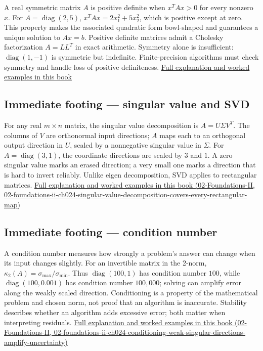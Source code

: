 A real symmetric matrix \(A\) is positive definite when \(x^TAx>0\) for every nonzero \(x\). For \(A=\operatorname{diag}(2,5)\), \(x^TAx=2x_1^2+5x_2^2\), which is positive except at zero. This property makes the associated quadratic form bowl-shaped and guarantees a unique solution to \(Ax=b\). Positive definite matrices admit a Cholesky factorization \(A=LL^T\) in exact arithmetic. Symmetry alone is insufficient: \(\operatorname{diag}(1,-1)\) is symmetric but indefinite. Finite-precision algorithms must check symmetry and handle loss of positive definiteness. \hyperref[01-foundations-i-ch020-positive-definiteness-is-a-structural-promise]{Full explanation and worked examples in this book}

\subsection{Immediate footing --- singular value and SVD}\label{01-foundations-i-ch018-immediate-footing-singular-value-and-svd}

For any real \(m\times n\) matrix, the singular value decomposition is \(A=U\Sigma V^T\). The columns of \(V\) are orthonormal input directions; \(A\) maps each to an orthogonal output direction in \(U\), scaled by a nonnegative singular value in \(\Sigma\). For \(A=\operatorname{diag}(3,1)\), the coordinate directions are scaled by \(3\) and \(1\). A zero singular value marks an erased direction; a very small one marks a direction that is hard to invert reliably. Unlike eigen decomposition, SVD applies to rectangular matrices. \href{../02-Foundations-II/main.pdf\#nameddest=02-foundations-ii-ch024-singular-value-decomposition-covers-every-rectangular-map}{Full explanation and worked examples in this book (02-Foundations-II, 02-foundations-ii-ch024-singular-value-decomposition-covers-every-rectangular-map)}

\subsection{Immediate footing --- condition number}\label{01-foundations-i-ch018-immediate-footing-condition-number}

A condition number measures how strongly a problem's answer can change when its input changes slightly. For an invertible matrix in the 2-norm, \(\kappa_2(A)=\sigma_{\max}/\sigma_{\min}\). Thus \(\operatorname{diag}(100,1)\) has condition number \(100\), while \(\operatorname{diag}(100,0.001)\) has condition number \(100{,}000\); solving can amplify error along the weakly scaled direction. Conditioning is a property of the mathematical problem and chosen norm, not proof that an algorithm is inaccurate. Stability describes whether an algorithm adds excessive error; both matter when interpreting residuals. \href{../02-Foundations-II/main.pdf\#nameddest=02-foundations-ii-ch024-conditioning-weak-singular-directions-amplify-uncertainty}{Full explanation and worked examples in this book (02-Foundations-II, 02-foundations-ii-ch024-conditioning-weak-singular-directions-amplify-uncertainty)}

